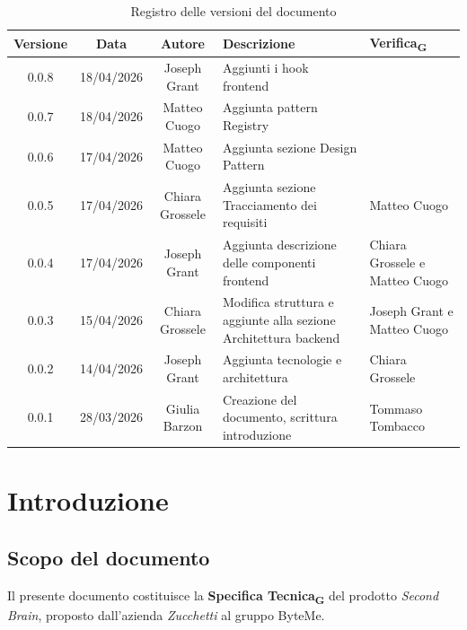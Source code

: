 \documentclass[11pt,a4paper]{article}
\newcommand{\gls}[1]{#1\textsubscript{G}}
\begin{document}
\begin{table}[H]
    \centering          
    \begin{tabular}{|c|c|c|>{\raggedright\arraybackslash}p{}|p{}|}
        \hline
        \textbf{Versione} & \textbf{Data} & \textbf{Autore} & \textbf{Descrizione} & \textbf{\gls{Verifica}} \\
        \hline
        0.0.8 & 18/04/2026 & Joseph Grant & Aggiunti i hook frontend & \\
        \hline
        0.0.7 & 18/04/2026 & Matteo Cuogo & Aggiunta pattern Registry & \\
        \hline
        0.0.6 & 17/04/2026 & Matteo Cuogo & Aggiunta sezione Design Pattern & \\
        \hline
        0.0.5 & 17/04/2026 & Chiara Grossele & Aggiunta sezione Tracciamento dei requisiti & Matteo Cuogo\\
        \hline
        0.0.4 & 17/04/2026 & Joseph Grant & Aggiunta descrizione delle componenti frontend & Chiara Grossele e Matteo Cuogo\\
        \hline
        0.0.3 & 15/04/2026 & Chiara Grossele & Modifica struttura e aggiunte alla sezione Architettura backend& Joseph Grant e Matteo Cuogo\\
        \hline
        0.0.2 & 14/04/2026 & Joseph Grant & Aggiunta tecnologie e architettura & Chiara Grossele\\
        \hline
        0.0.1 & 28/03/2026 & Giulia Barzon & Creazione del documento, scrittura introduzione & Tommaso Tombacco \\
        \hline
    \end{tabular}
    \caption{Registro delle versioni del documento}
    \label{tab:versionamento}
\end{table}
\newpage

\tableofcontents
\thispagestyle{empty}
\newpage

\setcounter{page}{1}

\section{Introduzione}
\subsection{Scopo del documento}
Il presente documento costituisce la \textbf{\gls{Specifica Tecnica}} del prodotto
\textit{Second Brain}, proposto dall'azienda \textit{Zucchetti} al
gruppo ByteMe.
 
\end{document}

